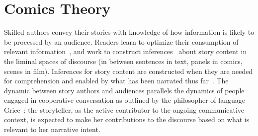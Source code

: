 \section{Comics Theory}

Skilled authors convey their stories with knowledge of how information is
likely to be processed by an audience.  Readers learn to optimize their
consumption of relevant information~\cite{pirolli2007information}, and work
to construct inferences~\cite{magliano2016filling} about story content in
the liminal spaces of discourse (in between sentences in text, panels in
comics, scenes in film). Inferences for story content are constructed when
they are needed for comprehension and enabled by what has
been narrated thus far~\cite{myers1987degree}. The dynamic
between story authors and audiences parallels the dynamics of people
engaged in cooperative conversation as outlined by the philosopher of
language Grice~\cite{grice1975logic}: the storyteller, as the active contributor
to the ongoing communicative context, is expected to make her contributions
to the discourse based on what is relevant to her narrative intent. 
% 
% 

